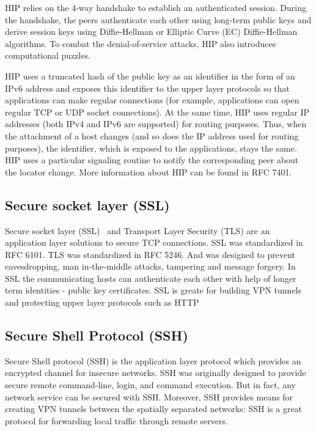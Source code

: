 HIP relies on the 4-way handshake to establish an authenticated session. During the handshake, the 
peers authenticate each other using long-term public keys and derive session keys using Diffie-Hellman 
or Elliptic Curve (EC) Diffie-Hellman algorithms. To combat the denial-of-service attacks, HIP also 
introduces computational puzzles. 

HIP uses a truncated hash of the public key as an identifier in the form of an IPv6 address and 
exposes this identifier to the upper layer protocols so that applications can make regular 
connections (for example, applications can open regular TCP or UDP socket connections). At the 
same time, HIP uses regular IP addresses (both IPv4 and IPv6 are supported) for routing purposes. 
Thus, when the attachment of a host changes (and so does the IP address used for routing purposes), 
the identifier, which is exposed to the applications, stays the same. HIP uses a particular 
signaling routine to notify the corresponding peer about the locator change. More information 
about HIP can be found in RFC 7401. 

\subsection{Secure socket layer (SSL)}
Secure socket layer (SSL)~\cite{ssl} and Transport Layer Security (TLS) are an application 
layer solutions to secure TCP connections. SSL was standardized in RFC 6101. 
TLS was standardized in RFC 5246. And was designed to prevent eavesdropping, man 
in-the-middle attacks, tampering and message forgery. In SSL the communicating 
hosts can authenticate each other with help of longer term identities - public key certificates.
SSL is greate for building VPN tunnels and protecting upper layer protocols such as HTTP


\subsection{Secure Shell Protocol (SSH)}

Secure Shell protocol (SSH) is the application layer protocol which provides an encrypted channel 
for insecure networks. SSH was originally designed to provide secure remote command-line, login, 
and command execution. But in fact, any network service can be secured with SSH. Moreover, SSH 
provides means for creating VPN tunnels between the spatially separated networks: SSH is a great 
protocol for forwarding local traffic through remote servers. 

